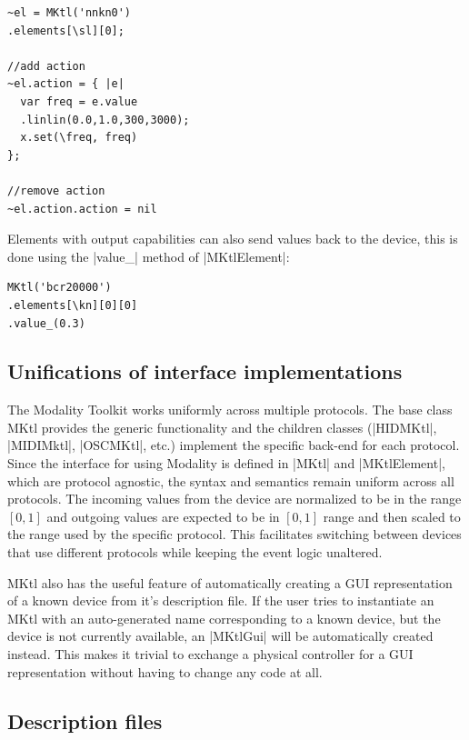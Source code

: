 \documentclass{article}
\begin{document}
\begin{Verbatim}
~el = MKtl('nnkn0')
.elements[\sl][0];

//add action
~el.action = { |e|
  var freq = e.value
  .linlin(0.0,1.0,300,3000);
  x.set(\freq, freq)
};

//remove action
~el.action.action = nil
\end{Verbatim}

Elements with output capabilities can also send values back to the device, this is done using the |value_| method of |MKtlElement|:

\begin{Verbatim}	
MKtl('bcr20000')
.elements[\kn][0][0]
.value_(0.3)
\end{Verbatim}

\subsection{Unifications of interface implementations}
\label{sub:unifications_of_interface_implementations}

The Modality Toolkit works uniformly across multiple protocols. The base class MKtl provides the generic functionality and the children classes (|HIDMKtl|, |MIDIMktl|, |OSCMKtl|, etc.) implement the specific back-end for each protocol. Since the interface for using Modality is defined in |MKtl| and |MKtlElement|, which are protocol agnostic, the syntax and semantics remain uniform across all protocols. The incoming values from the device are normalized to be in the range $[0,1]$ and outgoing values are expected to be in $[0,1]$ range and then scaled to the range used by the specific protocol. This facilitates switching between devices that use different protocols while keeping the event logic unaltered.

MKtl also has the useful feature of automatically creating a GUI representation of a known device from it's description file. If the user tries to instantiate an MKtl with an auto-generated name corresponding to a known device, but the device is not currently available, an |MKtlGui| will be automatically created instead. This makes it trivial to exchange a physical controller for a GUI representation without having to change any code at all.

\subsection{Description files}
\label{sub:descriptions_files}
\end{document}
